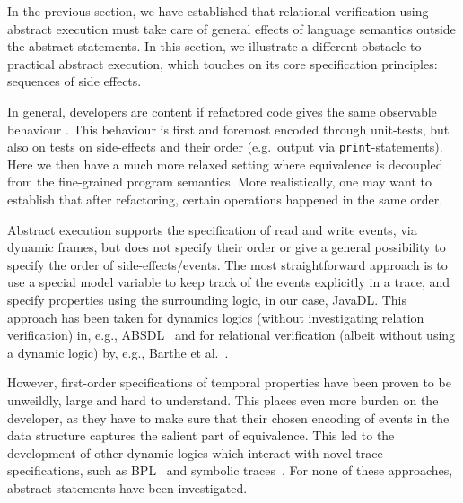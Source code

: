 In the previous section, we have established that relational verification using abstract execution
must take care of general effects of language semantics outside the abstract statements.
In this section, we illustrate a different obstacle to practical abstract execution, which touches on its core specification principles: sequences of side effects.

In general, developers are content if refactored code gives the same observable behaviour \cite{needed}.
This behaviour is first and foremost encoded through unit-tests, but also on tests on side-effects and their order (e.g.\ output via \texttt{print}-statements).
Here we then have a much more relaxed setting where equivalence is decoupled from the fine-grained program semantics.
More realistically, one may want to establish that after refactoring, certain operations happened in the same order.

Abstract execution supports the specification of read and write events, via dynamic frames, but does not specify their order or give a general possibility to
specify the order of side-effects/events. The most straightforward approach is to use a special model variable to keep track of the events explicitly in a trace, 
and specify properties using the surrounding logic, in our case, JavaDL. This approach has been taken for dynamics logics (without investigating relation verification) in, e.g., ABSDL~\cite{DBLP:journals/jlp/DinO14} and for relational verification (albeit without using a dynamic logic) by, e.g., Barthe et al.~\cite{DBLP:conf/fmcad/BartheEGGKM19}.

\begin{example}
\end{example}

However, first-order specifications of temporal properties have been proven to be unweildly, large and hard to understand. 
This places even more burden on the developer, as they have to make sure that their chosen encoding of events in the data structure captures the salient part of equivalence.
This led to the development of other dynamic logics which interact with novel trace specifications, such as BPL~\cite{DBLP:conf/tableaux/Kamburjan19} and symbolic traces~\cite{DBLP:conf/tableaux/BubelDHN15}. %
For none of these approaches, abstract statements have been investigated. %

